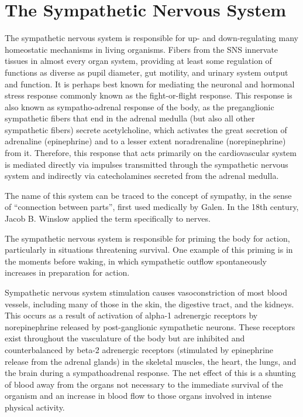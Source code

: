 \hypertarget{the-sympathetic-nervous-system}{%
\section{The Sympathetic Nervous System}\label{the-sympathetic-nervous-system}}

The sympathetic nervous system is responsible for up- and down-regulating many homeostatic mechanisms in living organisms. Fibers from the SNS innervate tissues in almost every organ system, providing at least some regulation of functions as diverse as pupil diameter, gut motility, and urinary system output and function. It is perhaps best known for mediating the neuronal and hormonal stress response commonly known as the fight-or-flight response. This response is also known as sympatho-adrenal response of the body, as the preganglionic sympathetic fibers that end in the adrenal medulla (but also all other sympathetic fibers) secrete acetylcholine, which activates the great secretion of adrenaline (epinephrine) and to a lesser extent noradrenaline (norepinephrine) from it. Therefore, this response that acts primarily on the cardiovascular system is mediated directly via impulses transmitted through the sympathetic nervous system and indirectly via catecholamines secreted from the adrenal medulla.

The name of this system can be traced to the concept of sympathy, in the sense of ``connection between parts'', first used medically by Galen. In the 18th century, Jacob B. Winslow applied the term specifically to nerves.

The sympathetic nervous system is responsible for priming the body for action, particularly in situations threatening survival. One example of this priming is in the moments before waking, in which sympathetic outflow spontaneously increases in preparation for action.

Sympathetic nervous system stimulation causes vasoconstriction of most blood vessels, including many of those in the skin, the digestive tract, and the kidneys. This occurs as a result of activation of alpha-1 adrenergic receptors by norepinephrine released by post-ganglionic sympathetic neurons. These receptors exist throughout the vasculature of the body but are inhibited and counterbalanced by beta-2 adrenergic receptors (stimulated by epinephrine release from the adrenal glands) in the skeletal muscles, the heart, the lungs, and the brain during a sympathoadrenal response. The net effect of this is a shunting of blood away from the organs not necessary to the immediate survival of the organism and an increase in blood flow to those organs involved in intense physical activity.

